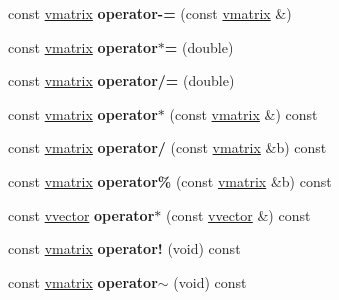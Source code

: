 \begin{DoxyCompactItemize}
\item 
const \hyperlink{classvmatrix}{vmatrix} {\bfseries operator-\/=} (const \hyperlink{classvmatrix}{vmatrix} \&)\hypertarget{classvmatrix_ac8d7f924ddebdaa6397fbd618fedb10b}{}\label{classvmatrix_ac8d7f924ddebdaa6397fbd618fedb10b}

\item 
const \hyperlink{classvmatrix}{vmatrix} {\bfseries operator$\ast$=} (double)\hypertarget{classvmatrix_a845026fdc251a99240d9ad328f5d16df}{}\label{classvmatrix_a845026fdc251a99240d9ad328f5d16df}

\item 
const \hyperlink{classvmatrix}{vmatrix} {\bfseries operator/=} (double)\hypertarget{classvmatrix_ac15a4c341b1ad413c2ac73d05701c4e1}{}\label{classvmatrix_ac15a4c341b1ad413c2ac73d05701c4e1}

\item 
const \hyperlink{classvmatrix}{vmatrix} {\bfseries operator$\ast$} (const \hyperlink{classvmatrix}{vmatrix} \&) const \hypertarget{classvmatrix_a9b2912c77f04d34552ab821cbea47726}{}\label{classvmatrix_a9b2912c77f04d34552ab821cbea47726}

\item 
const \hyperlink{classvmatrix}{vmatrix} {\bfseries operator/} (const \hyperlink{classvmatrix}{vmatrix} \&b) const \hypertarget{classvmatrix_abddb87783edb51947c4180e410631480}{}\label{classvmatrix_abddb87783edb51947c4180e410631480}

\item 
const \hyperlink{classvmatrix}{vmatrix} {\bfseries operator\%} (const \hyperlink{classvmatrix}{vmatrix} \&b) const \hypertarget{classvmatrix_a931d26d53f8445a330e5903be2348c44}{}\label{classvmatrix_a931d26d53f8445a330e5903be2348c44}

\item 
const \hyperlink{classvvector}{vvector} {\bfseries operator$\ast$} (const \hyperlink{classvvector}{vvector} \&) const \hypertarget{classvmatrix_ade5f4104b9668a86ec8d442c9cba2bfa}{}\label{classvmatrix_ade5f4104b9668a86ec8d442c9cba2bfa}

\item 
const \hyperlink{classvmatrix}{vmatrix} {\bfseries operator!} (void) const \hypertarget{classvmatrix_ae58c75edd251db16255286d8a8dc418a}{}\label{classvmatrix_ae58c75edd251db16255286d8a8dc418a}

\item 
const \hyperlink{classvmatrix}{vmatrix} {\bfseries operator$\sim$} (void) const \hypertarget{classvmatrix_a93aa0d40f1415adb4ed64f6f873bec12}{}\label{classvmatrix_a93aa0d40f1415adb4ed64f6f873bec12}


\end{DoxyCompactItemize}
